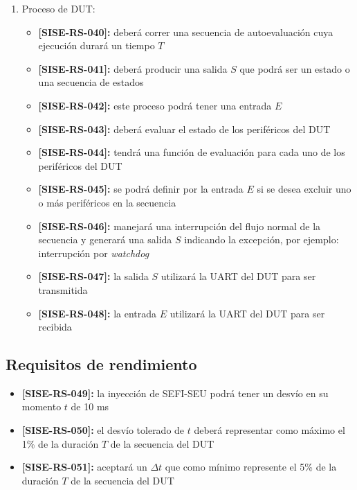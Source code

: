 \documentclass[
11pt, %
codirector, %
]{charter}
\def\codigo{SISE-RS}
\newcommand{\req}[1]{\textbf{[\codigo-#1]:}}
\begin{document}
\begin{enumerate}
\begin{itemize}
			\item \req{037} Se generará un archivo de histogramas llamado \\ ``histogramas-AAAAMMDDmm.his'' siendo AAAA el año del ensayo, MM el mes, DD el día, HH la hora y mm los minutos
			\item \req{038} El archivo de histogramas tendrá una tabla que indique la frecuencia de fallos como función de los SEFIs por registro del DUT
			\item \req{039} El archivo de histogramas tendrá una tabla que indique la frecuencia de fallos como función de los SEFIs por periférico del DUT
		\end{itemize}
	\item Proceso de DUT:
		\begin{itemize}
			\item \req{040} deberá correr una secuencia de autoevaluación cuya ejecución durará un tiempo $ T $
			\item \req{041} deberá producir una salida $ S $ que podrá ser un estado o una secuencia de estados
			\item \req{042} este proceso podrá tener una entrada $ E $
			\item \req{043} deberá evaluar el estado de los periféricos del DUT
			\item \req{044} tendrá una función de evaluación para cada uno de los periféricos del DUT
			\item \req{045} se podrá definir por la entrada $ E $ si se desea excluir uno o más periféricos en la secuencia
			\item \req{046} manejará una interrupción del flujo normal de la secuencia y generará una salida $ S $ indicando la excepción, por ejemplo: interrupción por \emph{watchdog}
			\item \req{047} la salida $ S $ utilizará la UART del DUT para ser transmitida
			\item \req{048} la entrada $ E $ utilizará la UART del DUT para ser recibida
		\end{itemize}
\end{enumerate}

\subsection{Requisitos de rendimiento}
\label{sub:rendimiento}

\begin{itemize}
	\item \req{049} la inyección de SEFI-SEU podrá tener un desvío en su momento $ t $ de 10 ms
	\item \req{050} el desvío tolerado de $ t $ deberá representar como máximo el 1\% de la duración $ T $ de la secuencia del DUT
	\item \req{051} aceptará un $ \Delta t $ que como mínimo represente el 5\% de la duración $ T $ de la secuencia del DUT
\end{itemize}
\end{document}
